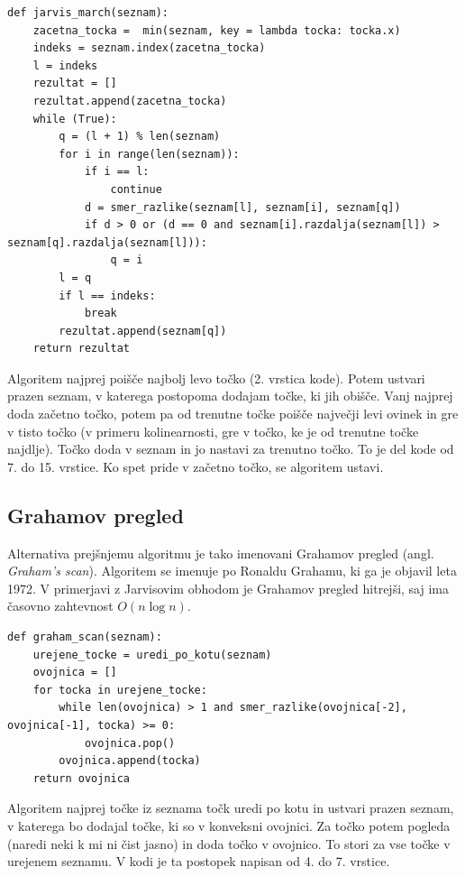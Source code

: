\documentclass[a4paper]{article}
\begin{document}
\begin{lstlisting}
def jarvis_march(seznam):
    zacetna_tocka =  min(seznam, key = lambda tocka: tocka.x)
    indeks = seznam.index(zacetna_tocka)
    l = indeks
    rezultat = []
    rezultat.append(zacetna_tocka)
    while (True):
        q = (l + 1) % len(seznam)
        for i in range(len(seznam)):
            if i == l:
                continue
            d = smer_razlike(seznam[l], seznam[i], seznam[q])
            if d > 0 or (d == 0 and seznam[i].razdalja(seznam[l]) > seznam[q].razdalja(seznam[l])):
                q = i
        l = q
        if l == indeks:
            break 
        rezultat.append(seznam[q])
    return rezultat
\end{lstlisting}

Algoritem najprej poišče najbolj levo točko (2. vrstica kode). Potem ustvari prazen seznam, v katerega postopoma dodajam točke, ki jih obišče. Vanj najprej doda začetno točko,
potem pa od trenutne točke poišče največji levi ovinek in gre v tisto točko (v primeru kolinearnosti, gre v točko, ke je od trenutne točke najdlje). Točko doda v seznam 
in jo nastavi za trenutno točko. To je del kode od 7. do 15. vrstice. Ko spet pride v začetno točko, se algoritem ustavi.

\subsection{Grahamov pregled}
Alternativa prejšnjemu algoritmu je tako imenovani Grahamov pregled (angl. \textit{Graham's scan}). Algoritem se imenuje po Ronaldu Grahamu, ki ga je objavil leta 1972. 
V primerjavi z Jarvisovim obhodom je Grahamov pregled hitrejši, saj ima časovno zahtevnost $O(n \log n)$.

\begin{lstlisting}
def graham_scan(seznam):
    urejene_tocke = uredi_po_kotu(seznam)
    ovojnica = []
    for tocka in urejene_tocke:
        while len(ovojnica) > 1 and smer_razlike(ovojnica[-2], ovojnica[-1], tocka) >= 0:  
            ovojnica.pop()
        ovojnica.append(tocka)
    return ovojnica
\end{lstlisting}

\newpage
Algoritem najprej točke iz seznama točk uredi po kotu in ustvari prazen seznam, v katerega bo dodajal točke, ki so v konveksni ovojnici. Za točko potem pogleda (naredi neki k mi ni čist
jasno) in doda točko v ovojnico. To stori za vse točke v urejenem seznamu. V kodi je ta postopek napisan od 4. do 7. vrstice.
\end{document}
